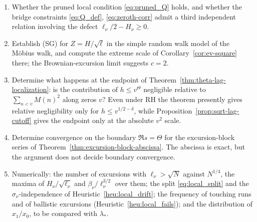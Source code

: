 \documentclass[11pt]{amsart}
\numberwithin{equation}{section}
\theoremstyle{plain}
\theoremstyle{definition}
\theoremstyle{remark}
\begin{document}
\begin{enumerate}[label=\textup{(\arabic*)}]
\item Whether the pruned local condition \eqref{eq:pruned_Q} holds, and
whether the bridge constraints \eqref{eq:Q_def}, \eqref{eq:zeroth-corr}
admit a third independent relation involving the defect
$\ell_\nu/2-H_\nu\ge0$.
\item Establish (SG) for $Z=H/\sqrt\ell$ in the simple random walk model of
the M\"obius walk, and compute the extreme scale of
Corollary~\ref{cor:ev-square} there; the Brownian-excursion limit suggests
$c=2$.
\item Determine what happens at the endpoint of
Theorem~\ref{thm:theta-lag-localization}: is the contribution of
$h\le v^\Theta$ negligible relative to
$\sum_{n<v}M(n)^2$ along zeros $v$?  Even under RH the theorem presently
gives relative negligibility only for $h\le v^{1/2-\delta}$, while
Proposition~\ref{prop:sqrt-lag-cutoff} gives the endpoint only at the
absolute $v^2$ scale.
\item Determine convergence on the boundary
$\Re s=\Theta$ for the excursion-block series of
Theorem~\ref{thm:excursion-block-abscissa}.  The abscissa is exact, but the
argument does not decide boundary convergence.
\item Numerically: the number of excursions with $\ell_\nu>\sqrt N$ against
$N^{1/4}$, the maxima of $H_\nu/\sqrt{\ell_\nu}$ and $\beta_\nu/\ell_\nu^{3/2}$
over them; the split \eqref{eq:local_split} and the $\sigma_\nu$-independence
of Heuristic~\ref{heu:local_drift}; the frequency of touching runs and of
ballistic excursions (Heuristic~\ref{heu:local_fails}); and the distribution
of $x_1/x_0$, to be compared with $\lambda_*$.
\end{enumerate}
\end{document}
